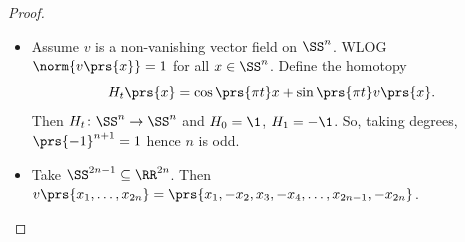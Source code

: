 \documentclass[10pt,a4paper,twoside,openany,hidelinks]{book}
\begin{document}
\begin{proof}
\begin{itemize}
\item Assume $v$ is a non-vanishing vector field on $\SS^n$. WLOG $\norm{v\prs{x}} = 1$ for all $x \in \SS^n$.
Define the homotopy
\[H_t\prs{x} = \cos\prs{\pi t}x + \sin\prs{\pi t} v\prs{x} \text{.}\]
Then $H_t \colon \SS^n \to \SS^n$ and $H_0 = \1$, $H_1 = -\1$. So, taking degrees, $\prs{-1}^{n+1} = 1$ hence $n$ is odd.
\item Take $\SS^{2n - 1} \subseteq \RR^{2n}$. Then
$v\prs{x_1, \ldots, x_{2n}} = \prs{x_1, -x_2, x_3, -x_4, \ldots, x_{2n-1}, -x_{2n}}$.
\end{itemize}
\end{proof}

\backmatter
\end{document}
